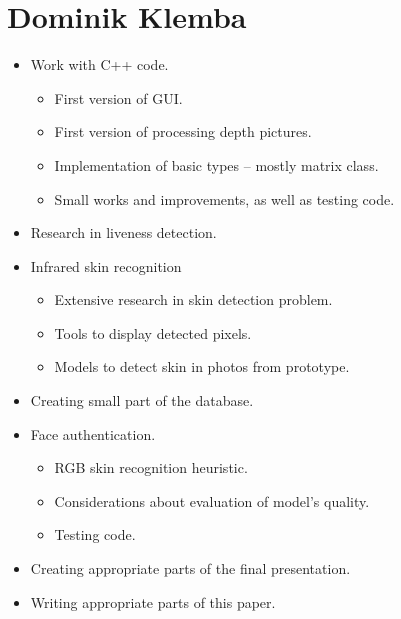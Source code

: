     \section{Dominik Klemba}
        \begin{itemize}
            \item Work with C++ code.
            \begin{itemize}
                \item First version of GUI.
                \item First version of processing depth pictures.
                \item Implementation of basic types -- mostly matrix class.
                \item Small works and improvements, as well as testing code.
            \end{itemize}
            \item Research in liveness detection.
            \item Infrared skin recognition
            \begin{itemize}
                \item Extensive research in skin detection problem.
                \item Tools to display detected pixels.
                \item Models to detect skin in photos from prototype.
            \end{itemize}
            \item Creating small part of the database.
            \item Face authentication.
            \begin{itemize}
                \item RGB skin recognition heuristic.
                \item Considerations about evaluation of model's quality.
                \item Testing code.
            \end{itemize}
            \item Creating appropriate parts of the final presentation.
            \item Writing appropriate parts of this paper.
        \end{itemize}

